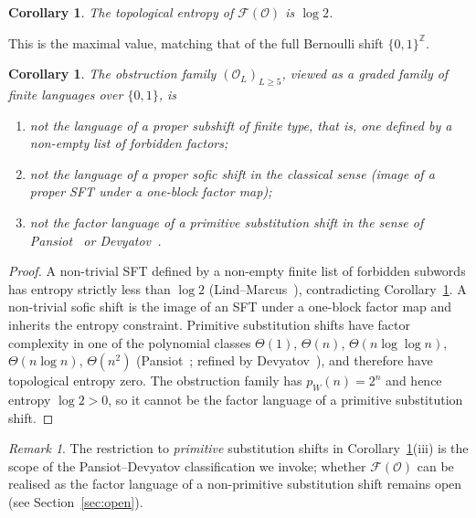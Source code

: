 \documentclass[11pt,reqno]{amsart}
\theoremstyle{plain}
\newtheorem{corollary}[theorem]{Corollary}
\theoremstyle{definition}
\theoremstyle{remark}
\newtheorem{remark}[theorem]{Remark}
\newcommand{\Z}{\mathbb{Z}}
\newcommand{\Obs}{\mathcal{O}}
\newcommand{\Fac}{\mathcal{F}}
\begin{document}
\begin{corollary}\label{cor:entropy}
The topological entropy of $\Fac(\Obs)$ is $\log 2$.
\end{corollary}

This is the maximal value, matching that of the full Bernoulli shift
$\{0,1\}^\Z$.

\begin{corollary}
\label{cor:no-substitution}
The obstruction family $(\Obs_L)_{L \ge 5}$, viewed as a graded family of
finite languages over $\{0,1\}$, is
\begin{enumerate}[label=(\roman*)]
\item not the language of a proper subshift of finite type, that is, one
  defined by a non-empty list of forbidden factors;
\item not the language of a proper sofic shift in the classical sense
  (image of a proper SFT under a one-block factor map);
\item not the factor language of a primitive substitution shift in the
  sense of Pansiot~\cite{Pansiot1984} or Devyatov~\cite{Devyatov2015}.
\end{enumerate}
\end{corollary}

\begin{proof}
A non-trivial SFT defined by a non-empty finite list of forbidden subwords
has entropy strictly less than $\log 2$ (Lind--Marcus~\cite{LindMarcus1995}),
contradicting Corollary~\ref{cor:entropy}. A non-trivial sofic shift is the image of an
SFT under a one-block factor map and inherits the entropy constraint.
Primitive substitution shifts have factor complexity in one of the polynomial
classes $\Theta(1)$, $\Theta(n)$, $\Theta(n \log \log n)$, $\Theta(n \log n)$,
$\Theta(n^2)$ (Pansiot~\cite{Pansiot1984}; refined by
Devyatov~\cite{Devyatov2015}), and therefore have topological entropy
zero. The obstruction family has $p_W(n) = 2^n$ and hence entropy
$\log 2 > 0$, so it cannot be the factor language of a primitive
substitution shift. \qedhere
\end{proof}

\begin{remark}\label{rem:non-primitive}
The restriction to \emph{primitive} substitution shifts in
Corollary~\ref{cor:no-substitution}(iii) is the scope of the
Pansiot--Devyatov classification we invoke; whether $\Fac(\Obs)$ can be
realised as the factor language of a non-primitive substitution shift
remains open (see Section~\ref{sec:open}).
\end{remark}
\end{document}
